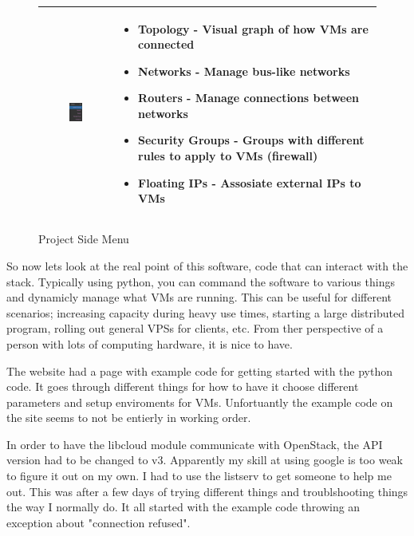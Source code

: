 \documentclass[12pt]{article}
\begin{document}
\begin{figure} [ht]
	\begin{tabular}{|c|p{}|}
		\hline
		\includegraphics[width=0.2\textwidth]{menu3.png} %
		&
		\begin{itemize}
			\vspace{-120pt}
			\item Topology - Visual graph of how VMs are connected
			\item Networks - Manage bus-like networks
			\item Routers - Manage connections between networks
			\item Security Groups - Groups with different rules to apply to VMs (firewall)
			\item Floating IPs - Assosiate external IPs to VMs
		\end{itemize}
		\\ \hline
	\end{tabular}
	
	\caption{Project Side Menu}
	\label{side_menu}
\end{figure}

\clearpage
\newpage
So now lets look at the real point of this software, code that can interact with the stack.
Typically using python, you can command the software to various things and dynamicly manage what VMs are running.
This can be useful for different scenarios; increasing capacity during heavy use times, starting a large distributed program, rolling out general VPSs for clients, etc.
From ther perspective of a person with lots of computing hardware, it is nice to have.

The website had a page with example code for getting started with the python code.
It goes through different things for how to have it choose different parameters and setup enviroments for VMs.
Unfortuantly the example code on the site seems to not be entierly in working order.

In order to have the libcloud module communicate with OpenStack, the API version had to be changed to v3.
Apparently my skill at using google is too weak to figure it out on my own.
I had to use the listserv to get someone to help me out.
This was after a few days of trying different things and troublshooting things the way I normally do.
It all started with the example code throwing an exception about "connection refused".
\end{document}

